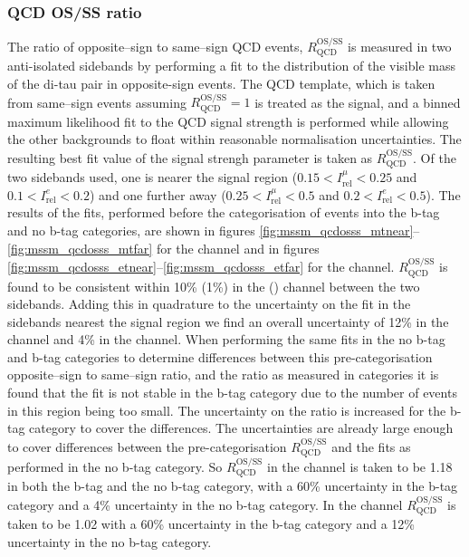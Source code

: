 \subsubsection{QCD OS/SS ratio}
\label{sec:mssm_bkgs_etmt_qcdosss}
The ratio of opposite--sign to same--sign QCD events, $R_{\text{QCD}}^{\text{OS/SS}}$ is measured
in two anti-isolated sidebands by performing a fit to the distribution of the
visible mass of the di-tau pair in 
opposite-sign events. The QCD template, which is taken from same--sign events 
assuming $R_{\text{QCD}}^{\text{OS/SS}} = 1$ is treated as the signal, and a binned maximum
likelihood fit to the QCD signal strength is performed while allowing the other
backgrounds to float within reasonable normalisation uncertainties. The
resulting best fit value of the signal strengh parameter is taken as $R_{\text{QCD}}^{\text{OS/SS}}$.
Of the two sidebands used, one is nearer the signal region ($0.15<I_{\text{rel}}^{\mu}<0.25$ and $0.1<I_{\text{rel}}^{e}<0.2$)
and one further away ($0.25<I_{\text{rel}}^{\mu}<0.5$ and $0.2<I_{\text{rel}}^{e}<0.5$). The results of the fits,
performed before the categorisation of events into the b-tag and no b-tag categories, are shown in figures \ref{fig:mssm_qcdosss_mtnear}--\ref{fig:mssm_qcdosss_mtfar}
for the \mutau channel and in figures \ref{fig:mssm_qcdosss_etnear}--\ref{fig:mssm_qcdosss_etfar} for the \etau channel.
$R_{\text{QCD}}^{\text{OS/SS}}$ is found to be consistent within 10\% (1\%) in the \etau (\mutau) channel between the two sidebands.
Adding this in quadrature to the uncertainty on the fit in the sidebands nearest the signal region we find
an overall uncertainty of 12\% in the \etau channel and 4\% in the \mutau channel.
When performing the same fits in the no b-tag and b-tag categories to determine differences between
this pre-categorisation opposite--sign to same--sign ratio, and the ratio as measured in categories it is found that 
the fit is not stable in the b-tag category due to the number of events in this region being too small.
The uncertainty on the ratio is increased for the b-tag category to cover the differences.
The uncertainties are already large enough to cover differences between the pre-categorisation $R_{\text{QCD}}^{\text{OS/SS}}$ and the
fits as performed in the no b-tag category. So $R_{\text{QCD}}^{\text{OS/SS}}$ in the \mutau channel is taken to be
1.18 in both the b-tag and the no b-tag category, with a 60\% uncertainty in the b-tag category and a 4\% uncertainty in the no b-tag category.
In the \etau channel $R_{\text{QCD}}^{\text{OS/SS}}$ is taken to be 1.02 with a 60\% uncertainty in the b-tag category and a 12\% uncertainty
in the no b-tag category.

